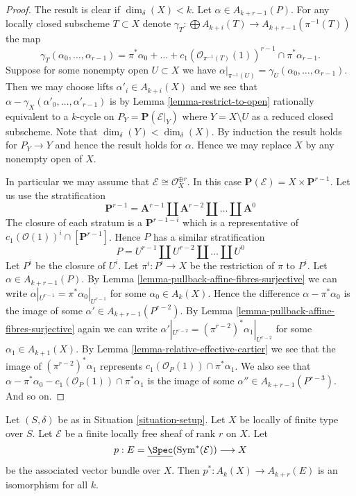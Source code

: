 \begin{proof}
\medskip\noindent
The result is clear if $\dim_\delta(X) < k$.
Let $\alpha \in A_{k + r - 1}(P)$.
For any locally closed subscheme $T \subset X$ denote
$\gamma_T : \bigoplus A_{k + i}(T) \to A_{k + r - 1}(\pi^{-1}(T))$
the map
$$
\gamma_T(\alpha_0, \ldots, \alpha_{r - 1})
= \pi^*\alpha_0 + \ldots +
c_1(\mathcal{O}_{\pi^{-1}(T)}(1))^{r - 1} \cap \pi^*\alpha_{r - 1}.
$$
Suppose for some nonempty open $U \subset X$ we have
$\alpha|_{\pi^{-1}(U)} = \gamma_U(\alpha_0, \ldots, \alpha_{r - 1})$.
Then we may choose lifts $\alpha'_i \in A_{k + i}(X)$ and we
see that $\alpha - \gamma_X(\alpha'_0, \ldots, \alpha'_{r - 1})$
is by Lemma \ref{lemma-restrict-to-open}
rationally equivalent to a $k$-cycle on $P_Y = \mathbf{P}(\mathcal{E}|_Y)$
where $Y = X \setminus U$ as a reduced closed subscheme.
Note that $\dim_\delta(Y) < \dim_\delta(X)$.
By induction the result holds
for $P_Y \to Y$ and hence the result holds for $\alpha$.
Hence we may replace $X$ by any nonempty open of $X$.

\medskip\noindent
In particular we may assume that $\mathcal{E} \cong \mathcal{O}_X^{\oplus r}$.
In this case $\mathbf{P}(\mathcal{E}) = X \times \mathbf{P}^{r - 1}$.
Let us use the stratification
$$
\mathbf{P}^{r - 1} = \mathbf{A}^{r - 1}
\amalg \mathbf{A}^{r - 2}
\amalg \ldots
\amalg \mathbf{A}^0
$$
The closure of each stratum is a $\mathbf{P}^{r - 1 - i}$ which is a
representative of $c_1(\mathcal{O}(1))^i \cap [\mathbf{P}^{r - 1}]$.
Hence $P$ has a similar stratification
$$
P = U^{r - 1} \amalg U^{r - 2} \amalg \ldots \amalg U^0
$$
Let $P^i$ be the closure of $U^i$. Let $\pi^i : P^i \to X$
be the restriction of $\pi$ to $P^i$.
Let $\alpha \in A_{k + r - 1}(P)$. By
Lemma \ref{lemma-pullback-affine-fibres-surjective}
we can write $\alpha|_{U^{r - 1}} = \pi^*\alpha_0|_{U^{r - 1}}$
for some $\alpha_0 \in A_k(X)$. Hence the difference
$\alpha - \pi^*\alpha_0$ is the image of some
$\alpha' \in A_{k + r - 1}(P^{r - 2})$.
By Lemma \ref{lemma-pullback-affine-fibres-surjective}
again we can write
$\alpha'|_{U^{r - 2}} = (\pi^{r - 2})^*\alpha_1|_{U^{r - 2}}$
for some $\alpha_1 \in A_{k + 1}(X)$.
By Lemma \ref{lemma-relative-effective-cartier}
we see that the image of $(\pi^{r - 2})^*\alpha_1$
represents $c_1(\mathcal{O}_P(1)) \cap \pi^*\alpha_1$.
We also see that
$\alpha - \pi^*\alpha_0 - c_1(\mathcal{O}_P(1)) \cap \pi^*\alpha_1$
is the image of some $\alpha'' \in A_{k + r - 1}(P^{r - 3})$.
And so on.
\end{proof}

\begin{lemma}
\label{lemma-vectorbundle}
Let $(S, \delta)$ be as in Situation \ref{situation-setup}.
Let $X$ be locally of finite type over $S$.
Let $\mathcal{E}$ be a finite locally free sheaf of rank $r$ on $X$.
Let
$$
p :
E = \underline{\Spec}(\text{Sym}^*(\mathcal{E}))
\longrightarrow
X
$$
be the associated vector bundle over $X$.
Then $p^* : A_k(X) \to A_{k + r}(E)$ is an isomorphism for all $k$.
\end{lemma}

